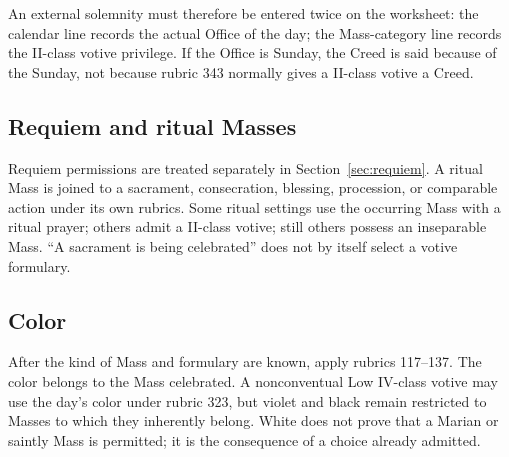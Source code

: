 An external solemnity must therefore be entered twice on the worksheet: the calendar line records the actual Office of the day; the Mass-category line records the II-class votive privilege. If the Office is Sunday, the Creed is said because of the Sunday, not because rubric 343 normally gives a II-class votive a Creed.

\subsection{Requiem and ritual Masses}

Requiem permissions are treated separately in Section~\ref{sec:requiem}. A ritual Mass is joined to a sacrament, consecration, blessing, procession, or comparable action under its own rubrics. Some ritual settings use the occurring Mass with a ritual prayer; others admit a II-class votive; still others possess an inseparable Mass. “A sacrament is being celebrated” does not by itself select a votive formulary.

\subsection{Color}

After the kind of Mass and formulary are known, apply rubrics 117--137. The color belongs to the Mass celebrated. A nonconventual Low IV-class votive may use the day's color under rubric 323, but violet and black remain restricted to Masses to which they inherently belong. White does not prove that a Marian or saintly Mass is permitted; it is the consequence of a choice already admitted.

